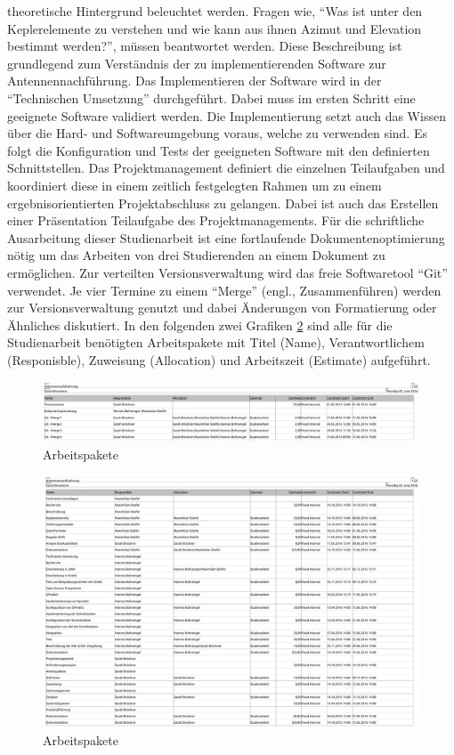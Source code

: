theoretische Hintergrund beleuchtet werden. Fragen wie, ``Was ist unter den Keplerelemente zu 
verstehen und wie kann aus ihnen Azimut und Elevation bestimmt werden?'', müssen beantwortet 
werden. Diese Beschreibung ist grundlegend zum Verständnis der zu implementierenden Software 
zur Antennennachführung. Das Implementieren der Software wird in der ``Technischen Umsetzung'' 
durchgeführt. Dabei muss im ersten Schritt eine geeignete Software validiert werden. Die 
Implementierung setzt auch das Wissen über die Hard- und Softwareumgebung voraus, welche zu 
verwenden sind. Es folgt die Konfiguration und Tests der geeigneten Software mit den definierten 
Schnittstellen.
\newpar
Das Projektmanagement definiert die einzelnen Teilaufgaben und koordiniert diese in einem zeitlich 
festgelegten Rahmen um zu einem ergebnisorientierten Projektabschluss zu gelangen. Dabei ist auch 
das Erstellen einer Präsentation Teilaufgabe des Projektmanagements.
\newpar
Für die schriftliche Ausarbeitung dieser Studienarbeit ist eine fortlaufende Dokumentenoptimierung 
nötig um das Arbeiten von drei Studierenden an einem Dokument zu ermöglichen. Zur verteilten 
Versionsverwaltung wird das freie Softwaretool ``Git'' verwendet. Je vier Termine zu einem 
``Merge'' (engl., Zusammenführen) werden zur Versionsverwaltung genutzt und dabei Änderungen von 
Formatierung oder Ähnliches diskutiert.
\newpar
In den folgenden zwei Grafiken \ref{fig:arbeitspaket} sind alle für die Studienarbeit benötigten 
Arbeitspakete mit Titel (Name), Verantwortlichem (Responisble), Zuweisung (Allocation) und 
Arbeitszeit (Estimate) aufgeführt.
\begin{figure}[h] 
 \centering
\includegraphics[width=1.0\linewidth]{./images/01tasks}
\caption{Arbeitspakete}
 \label{fig:arbeitspaket}
\end{figure}
\newpage
\begin{figure}[t] 
 \centering
\includegraphics[width=1.0\linewidth]{./images/02tasks}
\caption{Arbeitspakete}
 \label{fig:arbeitspaket}
\end{figure}
